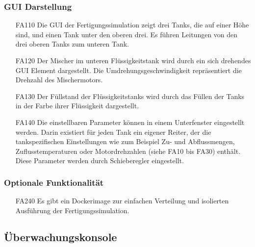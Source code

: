 \documentclass[parskip=full]{scrartcl}
\begin{document}
\subsubsection{GUI Darstellung}
\begin{enumerate}
\item[FA110] Die GUI der Fertigungssimulation zeigt drei Tanks, die auf einer Höhe sind, und einen Tank unter den oberen drei.
Es führen Leitungen von den drei oberen Tanks zum unteren Tank.
\item[FA120] Der Mischer im unteren Flüssigkeitstank wird durch ein sich drehendes GUI Element dargestellt.
Die Umdrehungsgeschwindigkeit repräsentiert die Drehzahl des Mischermotors.
\item[FA130] Der Füllstand der Flüssigkeitstanks wird durch das Füllen der Tanks in der Farbe ihrer Flüssigkeit dargestellt.
\item[FA140] Die einstellbaren Parameter können in einem Unterfenster eingestellt werden. Darin existiert für jeden Tank ein eigener Reiter, der die 
tankspezifischen Einstellungen wie zum Beispiel Zu- und Abflussmengen, Zuflusstemperaturen oder Motordrehzahlen (siehe FA10 bis FA30) enthält.
Diese Parameter werden durch Schieberegler eingestellt.
\end{enumerate}

\subsubsection{Optionale Funktionalität}
\label{fertigung-optional}
\begin{enumerate}
\item[FA240] Es gibt ein Dockerimage zur einfachen Verteilung und isolierten Ausführung der Fertigungssimulation.
\end{enumerate}

\subsection{Überwachungskonsole}
\end{document}
